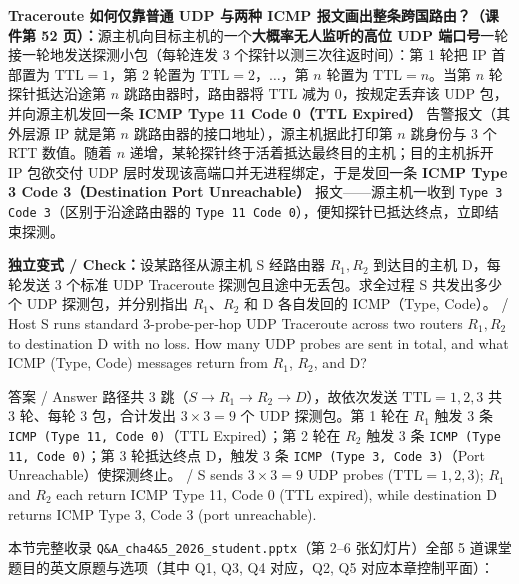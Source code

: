 \textbf{Traceroute 如何仅靠普通 UDP 与两种 ICMP 报文画出整条跨国路由？（课件第 52 页）：}源主机向目标主机的一个\textbf{大概率无人监听的高位 UDP 端口号}一轮接一轮地发送探测小包（每轮连发 3 个探针以测三次往返时间）：第 1 轮把 IP 首部置为 $\mathrm{TTL} = 1$，第 2 轮置为 $\mathrm{TTL} = 2$，$\dots$，第 $n$ 轮置为 $\mathrm{TTL} = n$。当第 $n$ 轮探针抵达沿途第 $n$ 跳路由器时，路由器将 TTL 减为 $0$，按规定丢弃该 UDP 包，并向源主机发回一条 \textbf{ICMP Type 11 Code 0（TTL Expired）} 告警报文（其外层源 IP 就是第 $n$ 跳路由器的接口地址），源主机据此打印第 $n$ 跳身份与 3 个 RTT 数值。随着 $n$ 递增，某轮探针终于活着抵达最终目的主机；目的主机拆开 IP 包欲交付 UDP 层时发现该高端口并无进程绑定，于是发回一条 \textbf{ICMP Type 3 Code 3（Destination Port Unreachable）} 报文——源主机一收到 \texttt{Type 3 Code 3}（区别于沿途路由器的 \texttt{Type 11 Code 0}），便知探针已抵达终点，立即结束探测。

\textbf{独立变式 / Check：}设某路径从源主机 S 经路由器 $R_1, R_2$ 到达目的主机 D，每轮发送 3 个标准 UDP Traceroute 探测包且途中无丢包。求全过程 S 共发出多少个 UDP 探测包，并分别指出 $R_1$、$R_2$ 和 D 各自发回的 ICMP（Type, Code）。 / Host S runs standard 3-probe-per-hop UDP Traceroute across two routers $R_1, R_2$ to destination D with no loss. How many UDP probes are sent in total, and what ICMP (Type, Code) messages return from $R_1$, $R_2$, and D?

\begin{StudySolution}{答案 / Answer}
路径共 3 跳（$S\to R_1\to R_2\to D$），故依次发送 $\mathrm{TTL}=1, 2, 3$ 共 3 轮、每轮 3 包，合计发出 $3\times 3 = 9$ 个 UDP 探测包。第 1 轮在 $R_1$ 触发 3 条 \texttt{ICMP (Type 11, Code 0)}（TTL Expired）；第 2 轮在 $R_2$ 触发 3 条 \texttt{ICMP (Type 11, Code 0)}；第 3 轮抵达终点 D，触发 3 条 \texttt{ICMP (Type 3, Code 3)}（Port Unreachable）使探测终止。 / S sends $3\times 3 = 9$ UDP probes ($\mathrm{TTL}=1,2,3$); $R_1$ and $R_2$ each return ICMP Type 11, Code 0 (TTL expired), while destination D returns ICMP Type 3, Code 3 (port unreachable).
\end{StudySolution}



本节完整收录 \texttt{Q\&A\_cha4\&5\_2026\_student.pptx}（第 2–6 张幻灯片）全部 5 道课堂题目的英文原题与选项（其中 Q1, Q3, Q4 对应，Q2, Q5 对应本章控制平面）：

